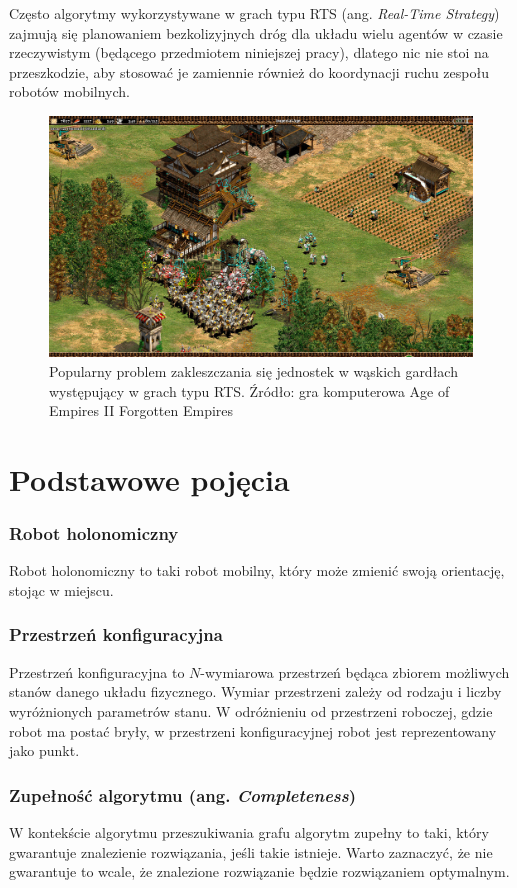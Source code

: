 Często algorytmy wykorzystywane w grach typu RTS (ang. {\it Real-Time Strategy}) zajmują się planowaniem bezkolizyjnych dróg dla układu wielu agentów w czasie rzeczywistym (będącego przedmiotem niniejszej pracy), dlatego nic nie stoi na przeszkodzie, aby stosować je zamiennie również do koordynacji ruchu zespołu robotów mobilnych.

\begin{figure}[H]
	\centering
	\includegraphics[width=13cm]{img/games/age-deadlock2}
	\caption{Popularny problem zakleszczania się jednostek w wąskich gardłach występujący w grach typu RTS. Źródło: gra komputerowa Age of Empires II Forgotten Empires}
	\label{fig:img_games_age-deadlock}
\end{figure}

\section{Podstawowe pojęcia}
\subsubsection{Robot holonomiczny}
Robot holonomiczny to taki robot mobilny, który może zmienić swoją orientację, stojąc w miejscu.

\subsubsection{Przestrzeń konfiguracyjna}
Przestrzeń konfiguracyjna to $N$-wymiarowa przestrzeń będąca zbiorem możliwych stanów danego układu fizycznego.
Wymiar przestrzeni zależy od rodzaju i liczby wyróżnionych parametrów stanu.
W odróżnieniu od przestrzeni roboczej, gdzie robot ma postać bryły, w przestrzeni konfiguracyjnej robot jest reprezentowany jako punkt.

\subsubsection{Zupełność algorytmu (ang. {\it Completeness})}
W kontekście algorytmu przeszukiwania grafu algorytm zupełny to taki, który gwarantuje znalezienie rozwiązania, jeśli takie istnieje.
Warto zaznaczyć, że nie gwarantuje to wcale, że znalezione rozwiązanie będzie rozwiązaniem optymalnym.

